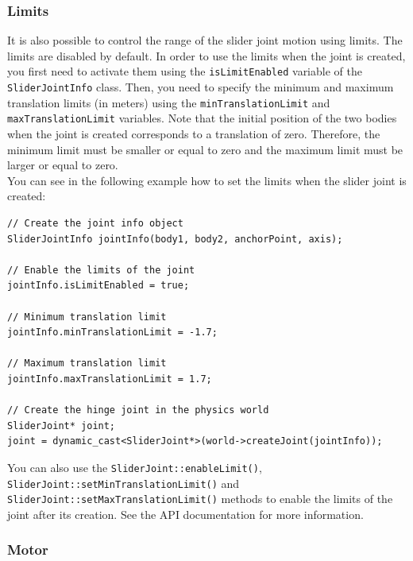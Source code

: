 \documentclass[a4paper,12pt]{article}
\begin{document}
    \subsubsection{Limits}

    It is also possible to control the range of the slider joint motion using limits. The limits are disabled by default. In order to use the limits when the joint is created, you first
    need to activate them using the \texttt{isLimitEnabled} variable of the \texttt{SliderJointInfo} class. Then, you need to specify the minimum and maximum translation limits
    (in meters) using the \texttt{minTranslationLimit} and \texttt{maxTranslation\-Limit} variables. Note that the initial position of the two bodies when the joint is created
    corresponds to a translation of zero. Therefore, the minimum limit must be smaller or equal to zero and the maximum limit must be larger or equal to zero. \\

    You can see in the following example how to set the limits when the slider joint is created: \\

    \begin{lstlisting}
// Create the joint info object
SliderJointInfo jointInfo(body1, body2, anchorPoint, axis);

// Enable the limits of the joint
jointInfo.isLimitEnabled = true;

// Minimum translation limit
jointInfo.minTranslationLimit = -1.7;

// Maximum translation limit
jointInfo.maxTranslationLimit = 1.7;

// Create the hinge joint in the physics world
SliderJoint* joint;
joint = dynamic_cast<SliderJoint*>(world->createJoint(jointInfo));
  \end{lstlisting}

    \vspace{0.6cm}

   \begin{sloppypar}
     You can also use the \texttt{SliderJoint::enableLimit()}, \texttt{SliderJoint::\-setMinTranslationLimit()} and \texttt{SliderJoint::setMaxTranslationLimit()} methods to
     enable the limits of the joint after its creation. See the API documentation for more information.
    \end{sloppypar}

    \subsubsection{Motor}
\end{document}
